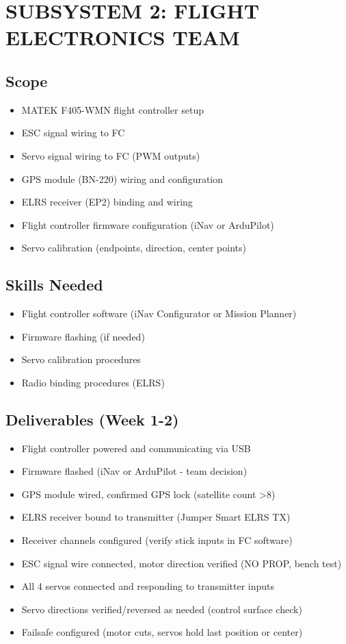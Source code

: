 \documentclass[11pt,letterpaper]{article}
\begin{document}
{\section{SUBSYSTEM 2: FLIGHT ELECTRONICS TEAM}

\subsection{Scope}

\begin{itemize}
  \item MATEK F405-WMN flight controller setup
  \item ESC signal wiring to FC
  \item Servo signal wiring to FC (PWM outputs)
  \item GPS module (BN-220) wiring and configuration
  \item ELRS receiver (EP2) binding and wiring
  \item Flight controller firmware configuration (iNav or ArduPilot)
  \item Servo calibration (endpoints, direction, center points)
\end{itemize}

\subsection{Skills Needed}

\begin{itemize}
  \item Flight controller software (iNav Configurator or Mission Planner)
  \item Firmware flashing (if needed)
  \item Servo calibration procedures
  \item Radio binding procedures (ELRS)
\end{itemize}

\subsection{Deliverables (Week 1-2)}

\begin{itemize}
  \item Flight controller powered and communicating via USB
  \item Firmware flashed (iNav or ArduPilot - team decision)
  \item GPS module wired, confirmed GPS lock (satellite count >8)
  \item ELRS receiver bound to transmitter (Jumper Smart ELRS TX)
  \item Receiver channels configured (verify stick inputs in FC software)
  \item ESC signal wire connected, motor direction verified (NO PROP, bench test)
  \item All 4 servos connected and responding to transmitter inputs
  \item Servo directions verified/reversed as needed (control surface check)
  \item Failsafe configured (motor cuts, servos hold last position or center)
\end{itemize}

}
\end{document}
